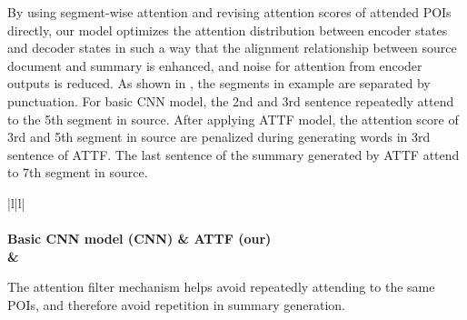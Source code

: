 By using segment-wise attention and revising attention scores of attended POIs directly,
our model optimizes the
attention distribution between encoder states and decoder states in such a way that
the alignment relationship between source document and summary is enhanced, 
and noise for attention from encoder outputs is reduced. 
As shown in , the segments in example are separated by punctuation.
For basic CNN model, the 2nd and 3rd sentence repeatedly attend to 
the 5th segment in source.
After applying ATTF model, 
the attention score of 3rd and 5th segment in source are penalized 
during generating words in 3rd sentence of ATTF.
The last sentence of the summary generated by ATTF attend to 7th segment in source.

\begin{table}[th!]
\begin{center}
\scriptsize
\caption{\label{tab:attn_exp} Summary generated by the basic CNN model and ATTF model}
\begin{tabular}{|l|l|}%
\hline 
{} \\
\hline
{} \\
\hline 
\bf Basic CNN model (CNN) & \bf ATTF (our) \\
\hline 
{} 
&  \\
\hline
\end{tabular}
\end{center}
\end{table}
The attention filter mechanism helps avoid repeatedly attending to the same POIs, and therefore avoid repetition in summary generation.



